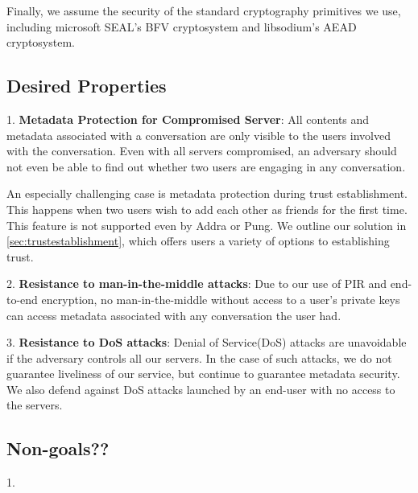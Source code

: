 
Finally, we assume the security of the standard cryptography primitives we use, including microsoft SEAL's BFV cryptosystem and libsodium's AEAD cryptosystem. 

\subsection{Desired Properties}

1. \textbf{Metadata Protection for Compromised Server}: All contents and metadata associated with a conversation are only visible to the users involved with the conversation. Even with all servers compromised, an adversary should not even be able to find out whether two users are engaging in any conversation.

An especially challenging case is metadata protection during trust establishment. This happens when two users wish to add each other as friends for the first time. This feature is not supported even by Addra or Pung. We outline our solution in \cref{sec:trustestablishment}, which offers users a variety of options to establishing trust.

2. \textbf{Resistance to man-in-the-middle attacks}: Due to our use of PIR and end-to-end encryption, no man-in-the-middle without access to a user's private keys can access metadata associated with any conversation the user had.

3. \textbf{Resistance to DoS attacks}: Denial of Service(DoS) attacks are unavoidable if the adversary controls all our servers. In the case of such attacks, we do not guarantee liveliness of our service, but continue to guarantee metadata security. We also defend against DoS attacks launched by an end-user with no access to the servers.

\subsection{Non-goals??}
1. 


